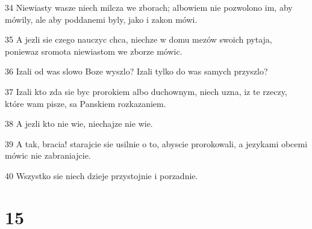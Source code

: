 \par 34 Niewiasty wasze niech milcza we zborach; albowiem nie pozwolono im, aby mówily, ale aby poddanemi byly, jako i zakon mówi.
\par 35 A jezli sie czego nauczyc chca, niechze w domu mezów swoich pytaja, poniewaz sromota niewiastom we zborze mówic.
\par 36 Izali od was slowo Boze wyszlo? Izali tylko do was samych przyszlo?
\par 37 Izali kto zda sie byc prorokiem albo duchownym, niech uzna, iz te rzeczy, które wam pisze, sa Panskiem rozkazaniem.
\par 38 A jezli kto nie wie, niechajze nie wie.
\par 39 A tak, bracia! starajcie sie usilnie o to, abyscie prorokowali, a jezykami obcemi mówic nie zabraniajcie.
\par 40 Wszystko sie niech dzieje przystojnie i porzadnie.

\chapter{15}

